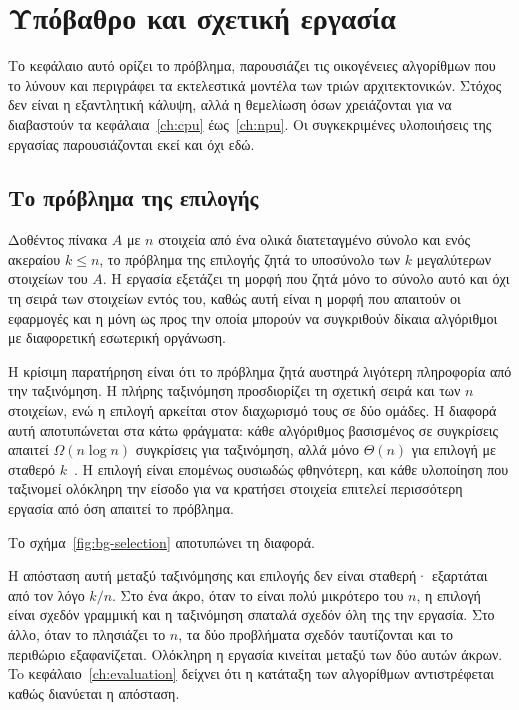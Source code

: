 \chapter{Υπόβαθρο και σχετική εργασία}
\label{ch:background}

Το κεφάλαιο αυτό ορίζει το πρόβλημα, παρουσιάζει τις οικογένειες αλγορίθμων που
το λύνουν και περιγράφει τα εκτελεστικά μοντέλα των τριών αρχιτεκτονικών. Στόχος
δεν είναι η εξαντλητική κάλυψη, αλλά η θεμελίωση όσων χρειάζονται για να
διαβαστούν τα κεφάλαια~\ref{ch:cpu} έως~\ref{ch:npu}. Οι συγκεκριμένες
υλοποιήσεις της εργασίας παρουσιάζονται εκεί και όχι εδώ.

\section{Το πρόβλημα της επιλογής }
\label{sec:bg-problem}

Δοθέντος πίνακα $A$ με $n$ στοιχεία από ένα ολικά διατεταγμένο σύνολο και ενός
ακεραίου $k \le n$, το πρόβλημα της επιλογής  ζητά το υποσύνολο των $k$
μεγαλύτερων στοιχείων του $A$. Η εργασία εξετάζει τη μορφή που ζητά μόνο το
σύνολο αυτό και όχι τη σειρά των στοιχείων εντός του, καθώς αυτή είναι η μορφή
που απαιτούν οι εφαρμογές και η μόνη ως προς την οποία μπορούν να συγκριθούν
δίκαια αλγόριθμοι με διαφορετική εσωτερική οργάνωση.

Η κρίσιμη παρατήρηση είναι ότι το πρόβλημα ζητά αυστηρά λιγότερη πληροφορία από
την ταξινόμηση. Η πλήρης ταξινόμηση προσδιορίζει τη σχετική σειρά και των $n$
στοιχείων, ενώ η επιλογή αρκείται στον διαχωρισμό τους σε δύο ομάδες. Η διαφορά
αυτή αποτυπώνεται στα κάτω φράγματα: κάθε αλγόριθμος βασισμένος σε συγκρίσεις
απαιτεί $\Omega(n \log n)$ συγκρίσεις για ταξινόμηση, αλλά μόνο $\Theta(n)$ για
επιλογή με σταθερό $k$~\cite{knuth1998}. Η επιλογή είναι επομένως ουσιωδώς
φθηνότερη, και κάθε υλοποίηση που ταξινομεί ολόκληρη την είσοδο για να κρατήσει
 στοιχεία επιτελεί περισσότερη εργασία από όση απαιτεί το πρόβλημα.

Το σχήμα~\ref{fig:bg-selection} αποτυπώνει τη διαφορά.



Η απόσταση αυτή μεταξύ ταξινόμησης και επιλογής δεν είναι σταθερή· εξαρτάται από
τον λόγο $k/n$. Στο ένα άκρο, όταν το  είναι πολύ μικρότερο του $n$, η
επιλογή είναι σχεδόν γραμμική και η ταξινόμηση σπαταλά σχεδόν όλη της την
εργασία. Στο άλλο, όταν το  πλησιάζει το $n$, τα δύο προβλήματα σχεδόν
ταυτίζονται και το περιθώριο εξαφανίζεται. Ολόκληρη η εργασία κινείται μεταξύ των
δύο αυτών άκρων. To κεφάλαιο~\ref{ch:evaluation} δείχνει ότι η κατάταξη των
αλγορίθμων αντιστρέφεται καθώς διανύεται η απόσταση.


